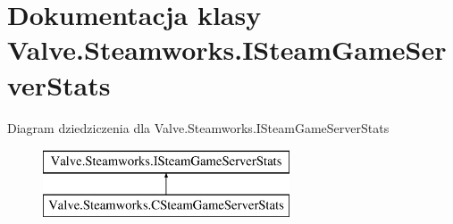\hypertarget{class_valve_1_1_steamworks_1_1_i_steam_game_server_stats}{}\section{Dokumentacja klasy Valve.\+Steamworks.\+I\+Steam\+Game\+Server\+Stats}
\label{class_valve_1_1_steamworks_1_1_i_steam_game_server_stats}
Diagram dziedziczenia dla Valve.\+Steamworks.\+I\+Steam\+Game\+Server\+Stats\begin{figure}[H]
\begin{center}
\leavevmode
\includegraphics[height=2.000000cm]{class_valve_1_1_steamworks_1_1_i_steam_game_server_stats}
\end{center}
\end{figure}
